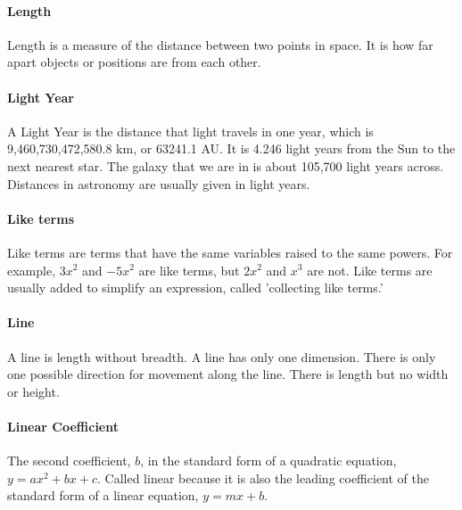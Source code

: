 \documentclass[12pt]{article}
\begin{document}
\paragraph{Length}
Length is a measure of the distance between two points in space. It is how far apart objects or positions are from each other.

\paragraph{Light Year}
A Light Year is the distance that light travels in one year, which is  9,460,730,472,580.8 km, or 63241.1 AU. It is 4.246 light years from the Sun to the next nearest star. The galaxy that we are in is about 105,700 light years across. Distances in astronomy are usually given in light years.

\paragraph{Like terms}
Like terms are terms that have the same variables raised to the same powers. For example, \(3x^2\) and \(-5x^2\) are like terms, but \(2x^2\) and \(x^3\) are not. Like terms are usually added to simplify an expression, called 'collecting like terms.'

\paragraph{Line}
A line is length without breadth. A line has only one dimension. There is only one possible direction for movement along the line. There is length but no width or height.
\begin{center}
\end{center}

\paragraph{Linear Coefficient}
The second coefficient, $b$, in the standard form of a quadratic equation, $y=ax^2+bx+c$. Called linear because it is also the leading coefficient of the standard form of a linear equation, $y=mx+b$.
\end{document}
